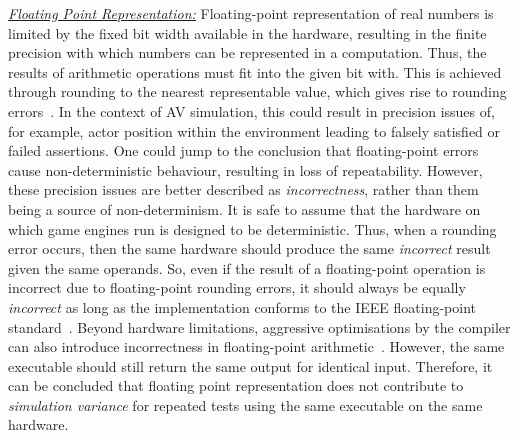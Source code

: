 \documentclass[letterpaper, 10 pt, journal, twoside]{IEEEtran}
\begin{document}
\noindent\underline{\textit{Floating Point Representation:}}
Floating-point representation of real numbers is limited by the fixed bit width available in the hardware, resulting in the finite precision with which numbers can be represented in a computation. 
Thus, the results of arithmetic operations must fit into the given bit with. This is achieved through rounding to the nearest representable value, which gives rise to rounding errors~\cite{FloatingPointsBook,goldberg1991every}. 
%
%
In the context of AV simulation, this could result in precision issues of, for example, actor position within the environment leading to falsely satisfied or failed assertions. 
%
One could jump to the conclusion that floating-point errors cause non-deterministic behaviour, resulting in loss of repeatability. However, these precision issues are better described as \textit{incorrectness}, rather than them being a source of non-determinism. 
%
It is safe to assume that the hardware on which game engines run is designed to be deterministic. 
%
Thus, when a rounding error occurs, then the same hardware should produce the same \textit{incorrect} result given the same operands. 
%
So, even if the result of a floating-point operation is incorrect due to floating-point rounding errors, it should always 
be equally \textit{incorrect} as long as the implementation conforms to the IEEE floating-point standard~\cite{8766229}.
%
Beyond hardware limitations, aggressive optimisations by the compiler can also introduce incorrectness in floating-point arithmetic~\cite{llvm-floating-point}. However, the same executable should still return the same output for identical input. 
%
Therefore, it can be concluded that floating point representation does not contribute to \textit{simulation variance} for repeated tests using the same executable on the same hardware.
%
\end{document}
